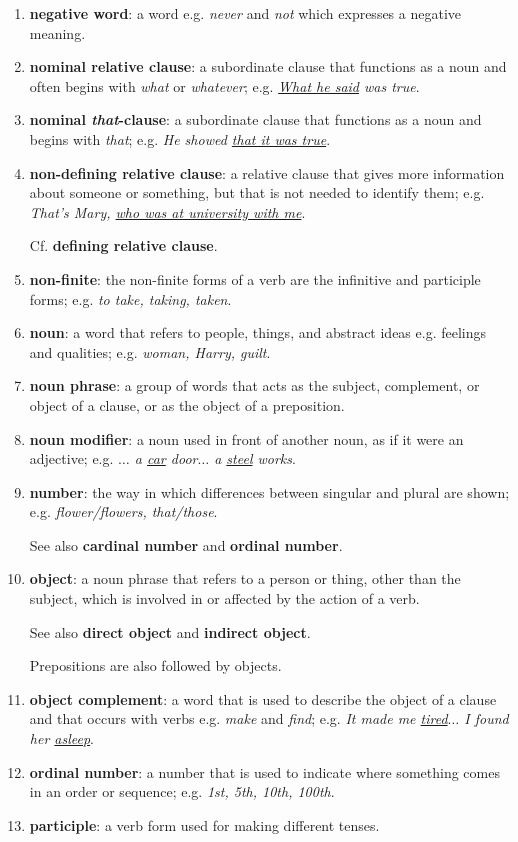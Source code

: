 \documentclass[oneside]{book}
\numberwithin{equation}{section}
\begin{document}
\begin{enumerate}
    The opposite is \textbf{affirmative}.
    \item \textbf{negative word}: a word e.g. \textit{never} and \textit{not} which expresses a negative meaning.
    \item \textbf{nominal relative clause}: a subordinate clause that functions as a noun and often begins with \textit{what} or \textit{whatever}; e.g. \textit{\underline{What he said} was true}.
    \item \textbf{nominal \textit{that}-clause}: a subordinate clause that functions as a noun and begins with \textit{that}; e.g. \textit{He showed \underline{that it was true}}.
    \item \textbf{non-defining relative clause}: a relative clause that gives more information about someone or something, but that is not needed to identify them; e.g. \textit{That's Mary, \underline{who was at university with me}}.
    
    Cf. \textbf{defining relative clause}.
    \item \textbf{non-finite}: the non-finite forms of a verb are the infinitive and participle forms; e.g. \textit{to take, taking, taken}.
    \item \textbf{noun}: a word that refers to people, things, and abstract ideas e.g. feelings and qualities; e.g. \textit{woman, Harry, guilt}.
    \item \textbf{noun phrase}: a group of words that acts as the subject, complement, or object of a clause, or as the object of a preposition.
    \item \textbf{noun modifier}: a noun used in front of another noun, as if it were an adjective; e.g. \textit{$\ldots$ a \underline{car} door$\ldots$ a \underline{steel} works}.
    \item \textbf{number}: the way in which differences between singular and plural are shown; e.g. \textit{flower/flowers, that/those}.
    
    See also \textbf{cardinal number} and \textbf{ordinal number}.
    \item \textbf{object}: a noun phrase that refers to a person or thing, other than the subject, which is involved in or affected by the action of a verb.
    
    See also \textbf{direct object} and \textbf{indirect object}.
    
    Prepositions are also followed by objects.
    \item \textbf{object complement}: a word that is used to describe the object of a clause and that occurs with verbs e.g. \textit{make} and \textit{find}; e.g. \textit{It made me \underline{tired}$\ldots$ I found her \underline{asleep}}.
    \item \textbf{ordinal number}: a number that is used to indicate where something comes in an order or sequence; e.g. \textit{1st, 5th, 10th, 100th}.
    \item \textbf{participle}: a verb form used for making different tenses.
    

\end{enumerate}
\end{document}
